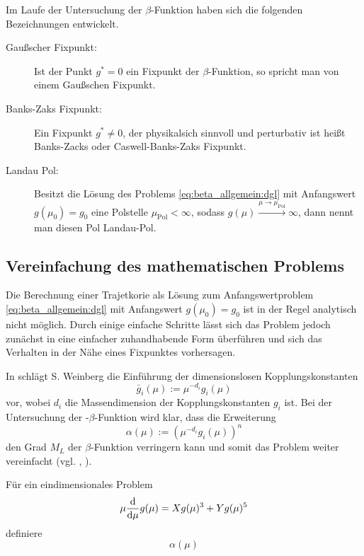   Im Laufe der Untersuchung der $\beta$-Funktion haben sich die folgenden Bezeichnungen 
  entwickelt.
  \begin{description}
   \item[Gaußscher Fixpunkt: ] Ist der Punkt $g^*=0$ ein Fixpunkt der $\beta$-Funktion, so 
			      spricht man von einem Gaußschen Fixpunkt.
   \item[Banks-Zaks Fixpunkt: ] Ein Fixpunkt $g^*\neq 0$, der physikalsich sinnvoll und 
			      perturbativ ist heißt Banks-Zacks oder 
			      Caswell-Banks-Zaks Fixpunkt.
   \item[Landau Pol: ] Besitzt die Lösung des Problems \eqref{eq:beta_allgemein:dgl} mit 
		      Anfangswert $g(\mu_0)=g_0$ eine Polstelle $\mu_\text{Pol}<\infty$, sodass 
		      $g(\mu)\overset{\mu\to\mu_\text{Pol}}{\longrightarrow}\infty$, dann nennt 
		      man diesen Pol Landau-Pol.
  \end{description}
  
  \subsection{Vereinfachung des mathematischen Problems}
      Die Berechnung einer Trajetkorie als Lösung zum Anfangswertproblem 
      \eqref{eq:beta_allgemein:dgl} mit Anfangswert $g(\mu_0)=g_0$ 
      ist in der Regel analytisch nicht möglich. Durch einige einfache Schritte lässt sich das 
      Problem jedoch zunächst in eine einfacher zuhandhabende Form überführen und sich das 
      Verhalten in der Nähe eines Fixpunktes vorhersagen.
      
      In \cite{General_relativity} schlägt S. Weinberg die Einführung der dimensionslosen 
      Kopplungskonstanten
      \begin{equation}
       \bar{g}_i(\mu):= \mu^{-d_i} g_i(\mu)
      \end{equation}
      vor, wobei $d_i$ die Massendimension der Kopplungskonstanten $g_i$ ist. Bei der 
      Untersuchung der \QCDxdQCD-$\beta$-Funktion wird klar, dass die Erweiterung 
      \begin{equation}
       \alpha(\mu):= \left(\mu^{-d_i} g_i(\mu)\right)^n
      \end{equation}
      den Grad $M_L$ der $\beta$-Funktion verringern kann und somit das Problem weiter 
      vereinfacht (vgl. \cite{arXiv:1406.2337}, \cite{PhysRevD.89.063522}). 
      \begin{beispiel}
	Für ein eindimensionales Problem
	\begin{equation}
	  \mu \frac{\text{d}}{\text{d} \mu} g(\mu) = X g(\mu)^3 + Y g(\mu)^5
	\end{equation}
	definiere 
	\begin{equation}
	 \alpha(\mu)
	\end{equation}

	

      \end{beispiel}

      


  
  
  
  
